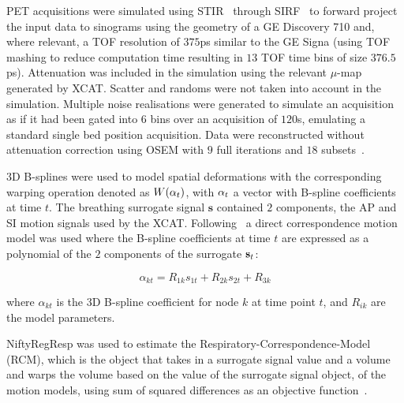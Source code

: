 \documentclass{IEEEtran}
\begin{document}
PET acquisitions were simulated using STIR~\cite{Thielemans2012,Efthimiou2018} through SIRF~\cite{Ovtchinnikov2017} to forward project the input data to sinograms using the geometry of a GE Discovery 710 and, where relevant, a TOF resolution of $375$ps similar to the GE Signa (using TOF mashing to reduce computation time resulting in $13$ TOF time bins of size $376.5$ps). Attenuation was included in the simulation using the relevant $\mu$-map generated by XCAT. Scatter and randoms were not taken into account in the simulation. Multiple noise realisations were generated to simulate an acquisition as if it had been gated into $6$ bins over an acquisition of $120$s, emulating a standard single bed position acquisition. Data were reconstructed without attenuation correction using OSEM with $9$ full iterations and $18$ subsets~\cite{Hudson1994}. 

3D B-splines were used to model spatial deformations with the corresponding warping operation denoted as $W(\bold{\alpha}_t)$, with $\bold{\alpha}_t$ a vector with B-spline coefficients at time $t$. The breathing surrogate signal $\bm{s}$ contained $2$ components, the AP and SI motion signals used by the XCAT.  Following~\cite{McClelland2013} a direct correspondence motion model was used where the B-spline coefficients at time $t$ are expressed as a polynomial of the $2$ components of the surrogate $\bold{s}_t$:

\begin{equation}
    \alpha_{kt} = R_{1k} s_{1t} + R_{2k} s_{2t} + R_{3k}
\end{equation}

\noindent where $\alpha_{kt}$ is the 3D B-spline coefficient for node $k$ at time point $t$, and $R_{ik}$ are the model parameters. 

NiftyRegResp was used to estimate the Respiratory-Correspondence-Model (RCM), which is the object that takes in a surrogate signal value and a volume and warps the volume based on the value of the surrogate signal object, of the motion models, using sum of squared differences as an objective function~\cite{McClelland2017}.
\end{document}
